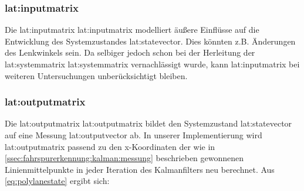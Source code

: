 \subsubsection{\glsdesc{lat:inputmatrix}}
Die \glsdesc{lat:inputmatrix} \gls{lat:inputmatrix} modelliert äußere Einflüsse auf die Entwicklung des Systemzustandes \gls{lat:statevector}. Dies könnten z.B. Änderungen des Lenkwinkels sein. Da selbiger jedoch schon bei der Herleitung der \glsdesc{lat:systemmatrix} \gls{lat:systemmatrix} vernachlässigt wurde, kann \gls{lat:inputmatrix} bei weiteren Untersuchungen unberücksichtigt bleiben.

\subsubsection{\glsdesc{lat:outputmatrix}} 
\label{sssec:fahrspurerkennung:kalman-filter:zustandsraumbeschreibung:outputmatrix}
Die \glsdesc{lat:outputmatrix} \gls{lat:outputmatrix} bildet den Systemzustand \gls{lat:statevector} auf eine Messung \gls{lat:outputvector} ab. In unserer Implementierung wird  \gls{lat:outputmatrix} passend zu den \gls{x}-Koordinaten der wie in \ref{ssec:fahrspurerkennung:kalman:messung} beschrieben gewonnenen Linienmittelpunkte in jeder Iteration des Kalmanfilters neu berechnet. Aus \ref{eq:polylanestate} ergibt sich:
